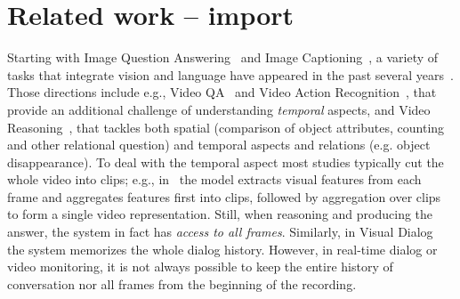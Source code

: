 \section{Related work -- import}


Starting with Image Question Answering~\cite{malinowski2014multi,antol2015} and Image Captioning~\cite{karpathy2015deep}, a variety of tasks that integrate vision and language have appeared in the past several years~\cite{mogadala2019trends}. 
Those directions include e.g., Video QA~\cite{MovieQA} and Video Action Recognition~\cite{monfort2019moments}, that provide an additional challenge of understanding \emph{temporal} aspects, and Video Reasoning~\cite{song2018explore,yang2018dataset}, that tackles both spatial (comparison of object attributes, counting and other relational question) and temporal aspects and relations (e.g. object disappearance).
To deal with the temporal aspect most studies typically cut the whole video into clips; e.g., in~\cite{song2018explore} the model extracts visual features from each frame and aggregates features first into clips, followed by aggregation over clips to form a single video representation.
Still, when reasoning and producing the answer, the system in fact has \textit{access to all frames}. 
Similarly, in Visual Dialog~\cite{das2017visual} the system memorizes the whole dialog history.
However, in real-time dialog or video monitoring, it is not always possible to keep the entire history of conversation nor all frames from the beginning of the recording.  


